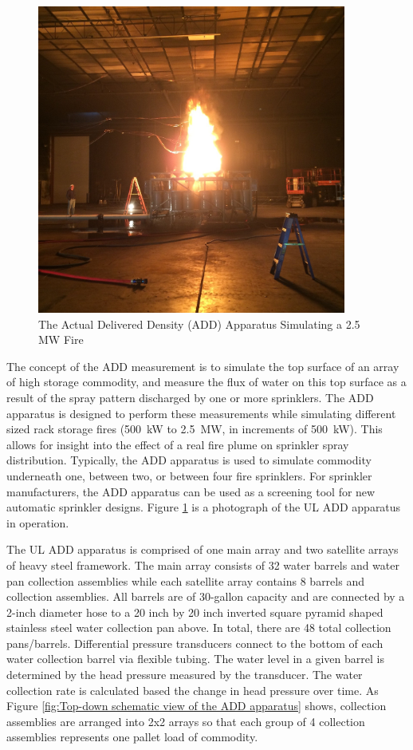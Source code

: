 \documentclass{article}
\begin{document}
\begin{figure}[!ht]
	\centering
	\includegraphics[width=4in]{Figures/Water_Distribution/ADD.jpg}
	\caption{The Actual Delivered Density (ADD) Apparatus Simulating a 2.5 MW Fire}
	\label{fig:ADD_Apparatus_Simulating_fire}
\end{figure}

The concept of the ADD measurement is to simulate the top surface of an array of high storage commodity, and measure the flux of water on this top surface as a result of the spray pattern discharged by one or more sprinklers. The ADD apparatus is designed to perform these measurements while simulating different sized rack storage fires (500~kW to 2.5~MW, in increments of 500~kW). This allows for insight into the effect of a real fire plume on sprinkler spray distribution. Typically, the ADD apparatus is used to simulate commodity underneath one, between two, or between four fire sprinklers. For sprinkler manufacturers, the ADD apparatus can be used as a screening tool for new automatic sprinkler designs. Figure \ref{fig:ADD_Apparatus_Simulating_fire} is a photograph of the UL ADD apparatus in operation.

The UL ADD apparatus is comprised of one main array and two satellite arrays of heavy steel framework. The main array consists of 32 water barrels and water pan collection assemblies while each satellite array contains 8 barrels and collection assemblies. All barrels are of 30-gallon capacity and are connected by a 2-inch diameter hose to a 20 inch by 20 inch inverted square pyramid shaped stainless steel water collection pan above. In total, there are 48 total collection pans/barrels. Differential pressure transducers connect to the bottom of each water collection barrel via flexible tubing. The water level in a given barrel is determined by the head pressure measured by the transducer. The water collection rate is calculated based the change in head pressure over time. As Figure \ref{fig:Top-down schematic view of the ADD apparatus} shows, collection assemblies are arranged into 2x2 arrays so that each group of 4 collection assemblies represents one pallet load of commodity.
\end{document}
